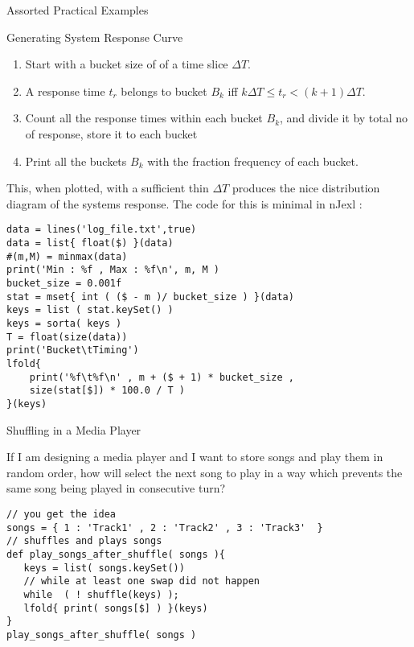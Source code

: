 \begin{section}{Assorted Practical Examples}
\begin{subsection}{Generating System Response Curve}
\begin{enumerate}
\item{Start with a bucket size of of a time slice $\Delta T$. }
\item{A response time $t_r$ belongs to bucket $B_k$ iff $  k \Delta T \le  t_r < (k+1) \Delta T  $. }
\item{Count all the response times within each bucket $B_k$, and divide it by total no of response, store it to each bucket }
\item{Print all the buckets $B_k$ with the fraction frequency of each bucket. }
\end{enumerate}

This, when plotted, with a sufficient thin $\Delta T$ produces the nice distribution diagram
of the systems response.
The code for this is minimal in nJexl :

\begin{center}\begin{minipage}{\linewidth}
\begin{lstlisting}[style=JexlStyle]
data = lines('log_file.txt',true)
data = list{ float($) }(data)
#(m,M) = minmax(data)
print('Min : %f , Max : %f\n', m, M )
bucket_size = 0.001f
stat = mset{ int ( ($ - m )/ bucket_size ) }(data)
keys = list ( stat.keySet() )
keys = sorta( keys )
T = float(size(data)) 
print('Bucket\tTiming')
lfold{
    print('%f\t%f\n' , m + ($ + 1) * bucket_size , 
    size(stat[$]) * 100.0 / T )
}(keys)
\end{lstlisting}  
\end{minipage}\end{center}
\end{subsection}

\begin{subsection}{Shuffling in a Media Player}

If I am designing a media player and I want to store songs and play them in random order, 
how will select the next song to play in a way which prevents the same song being played in consecutive turn?

\begin{center}\begin{minipage}{\linewidth}
\begin{lstlisting}[style=JexlStyle]
// you get the idea 
songs = { 1 : 'Track1' , 2 : 'Track2' , 3 : 'Track3'  }
// shuffles and plays songs 
def play_songs_after_shuffle( songs ){
   keys = list( songs.keySet())
   // while at least one swap did not happen 
   while  ( ! shuffle(keys) );
   lfold{ print( songs[$] ) }(keys)
}
play_songs_after_shuffle( songs )
\end{lstlisting}  
\end{minipage}\end{center}
\end{subsection}


\end{section}
